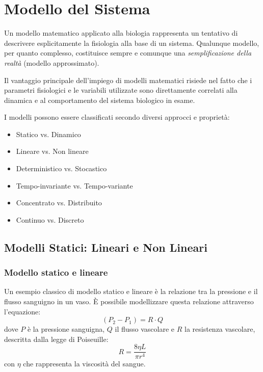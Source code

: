 \chapter{Modello del Sistema}
Un modello matematico applicato alla biologia rappresenta un tentativo di descrivere esplicitamente la fisiologia alla base di un sistema. Qualunque modello, per quanto complesso, costituisce sempre e comunque una \textit{semplificazione della realtà} (modello approssimato). 

Il vantaggio principale dell'impiego di modelli matematici risiede nel fatto che i parametri fisiologici e le variabili utilizzate sono direttamente correlati alla dinamica e al comportamento del sistema biologico in esame.

I modelli possono essere classificati secondo diversi approcci e proprietà:
\begin{itemize}
    \item Statico vs. Dinamico
    \item Lineare vs. Non lineare
    \item Deterministico vs. Stocastico
    \item Tempo-invariante vs. Tempo-variante
    \item Concentrato vs. Distribuito
    \item Continuo vs. Discreto
\end{itemize}

\section{Modelli Statici: Lineari e Non Lineari}

\subsection{Modello statico e lineare}
Un esempio classico di modello statico e lineare è la relazione tra la pressione e il flusso sanguigno in un vaso. È possibile modellizzare questa relazione attraverso l'equazione:
\begin{equation}
    (P_2 - P_1) = R \cdot Q
\end{equation}
dove $P$ è la pressione sanguigna, $Q$ il flusso vascolare e $R$ la resistenza vascolare, descritta dalla legge di Poiseuille:
\begin{equation}
    R = \frac{8\eta L}{\pi r^4}
\end{equation}
con $\eta$ che rappresenta la viscosità del sangue.

